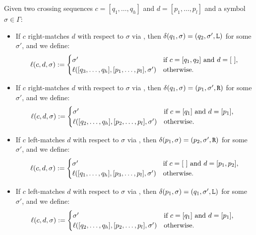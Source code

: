 \begin{defn}
	Given two crossing sequences $c=[q_1,\dots,q_h]$ and $d=[p_1,\dots,p_l]$ and a symbol $\sigma\in\Gamma$:
	\begin{itemize}
		\item If $c$ right-matches $d$ with respect to $\sigma$ via , then $\delta(q_1,\sigma)=(q_2,\sigma',\mathtt L)$ for some $\sigma'$, and we define:
		      \begin{equation*}
			      \ell(c,d,\sigma):=\begin{cases}
				      \sigma'                                        & \text{if } c=[q_1,q_2] \text{ and } d=[~], \\
				      \ell([q_3,\dots,q_h],[p_1,\dots,p_l],\sigma') & \text{otherwise}.
			      \end{cases}
		      \end{equation*}
		\item If $c$ right-matches $d$ with respect to $\sigma$ via , then $\delta(q_1,\sigma)=(p_1,\sigma',\mathtt R)$ for some $\sigma'$, and we define:
		      \begin{equation*}
			      \ell(c,d,\sigma):=\begin{cases}
				      \sigma'                                        & \text{if } c=[q_1] \text{ and } d=[p_1],~~ \\
				      \ell([q_2,\dots,q_h],[p_2,\dots,p_l],\sigma') & \text{otherwise}.
			      \end{cases}
		      \end{equation*}
		\item If $c$ left-matches $d$ with respect to $\sigma$ via , then $\delta(p_1,\sigma)=(p_2,\sigma',\mathtt R)$ for some $\sigma'$, and we define:
		      \begin{equation*}
			      \ell(c,d,\sigma):=\begin{cases}
				      \sigma'                                        & \text{if } c=[~] \text{ and } d=[p_1,p_2], \\
				      \ell([q_1,\dots,q_h],[p_3,\dots,p_l],\sigma') & \text{otherwise}.
			      \end{cases}
		      \end{equation*}
		\item If $c$ left-matches $d$ with respect to $\sigma$ via , then $\delta(p_1,\sigma)=(q_1,\sigma',\mathtt L)$ for some $\sigma'$, and we define:
		      \begin{equation*}
			      \ell(c,d,\sigma):=\begin{cases}
				      \sigma'                                        & \text{if } c=[q_1] \text{ and } d=[p_1],~~ \\
				      \ell([q_2,\dots,q_h],[p_2,\dots,p_l],\sigma') & \text{otherwise}.
			      \end{cases}
		      \end{equation*}
	\end{itemize}
\end{defn}
